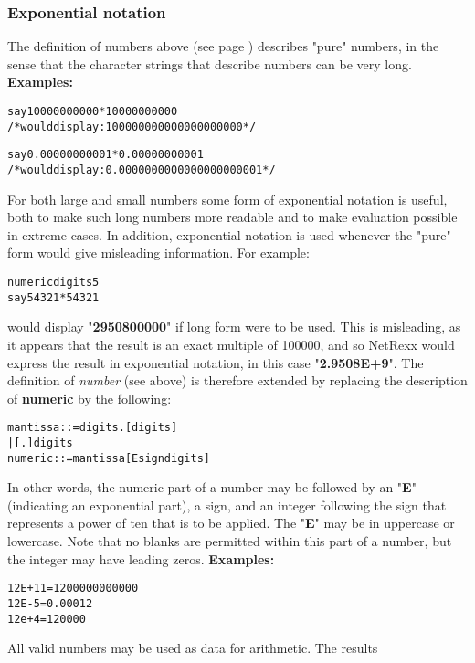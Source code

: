 \subsubsection{Exponential notation}
 The definition of numbers  above (see page \pageref{refdefnum}) 
describes "pure" numbers, in the sense that the character strings
that describe numbers can be very long.
 \textbf{Examples:}
\begin{alltt}
say  10000000000 * 10000000000
/* would display: 100000000000000000000 */

say  0.00000000001 * 0.00000000001
/* would display: 0.0000000000000000000001 */
\end{alltt}
For both large and small numbers some form of exponential notation
is useful, both to make such long numbers more readable and to make
evaluation possible in extreme cases.  In addition, exponential notation
is used whenever the "pure" form would give misleading
information.  For example:
\begin{alltt}
numeric digits 5
say 54321*54321
\end{alltt}
would display "\textbf{2950800000}" if long form were to be
used.
This is misleading, as it appears that the result is an exact multiple
of 100000, and so NetRexx would express the result in exponential
notation, in this case "\textbf{2.9508E+9}".
 The definition of \emph{number} (see above) is therefore extended
by replacing the description of \textbf{numeric} by the following:
\begin{alltt}
mantissa ::=  digits . [digits]
              | [.] digits
numeric  ::=  mantissa [E sign digits]
\end{alltt}
In other words, the numeric part of a number may be followed by an
"\textbf{E}" (indicating an exponential part), a sign,
and an integer following the sign that represents a power of ten that is
to be applied.
The "\textbf{E}" may be in uppercase or lowercase.
Note that no blanks are permitted within this part of a number, but the
integer may have leading zeros.
 \textbf{Examples:}
\begin{alltt}
12E+11  =  1200000000000
12E-5   =  0.00012
 12e+4  =  120000
\end{alltt}
 All valid numbers may be used as data for arithmetic.  The results
